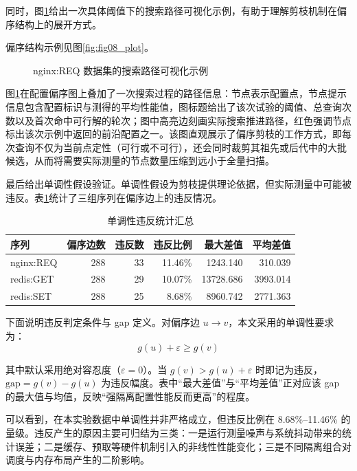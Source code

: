 \documentclass[UTF8,a4paper,12pt,twoside]{ctexart}  %
\begin{document}
同时，图\ref{fig:nginx-search-path}给出一次具体阈值下的搜索路径可视化示例，有助于理解剪枝机制在偏序结构上的展开方式。

偏序结构示例见图\ref{fig:fig08_plot}。

\begin{figure}[h]
  \centering
  
  \caption{nginx:REQ 数据集的搜索路径可视化示例}
  \label{fig:nginx-search-path}
\end{figure}

图\ref{fig:nginx-search-path}在配置偏序图上叠加了一次搜索过程的路径信息：节点表示配置点，节点提示信息包含配置标识与测得的平均性能值，图标题给出了该次试验的阈值、总查询次数以及首次命中可行解的轮次；图中高亮边刻画实际搜索推进路径，红色强调节点标出该次示例中返回的前沿配置之一。该图直观展示了偏序剪枝的工作方式，即每次查询不仅为当前点定性（可行或不可行），还会同时裁剪其祖先或后代中的大批候选，从而将需要实际测量的节点数量压缩到远小于全量扫描。

最后给出单调性假设验证。单调性假设为剪枝提供理论依据，但实际测量中可能被违反。表\ref{tab:monotonic-violation-summary}统计了三组序列在偏序边上的违反情况。

{\small
\setlength{\tabcolsep}{4pt}
\begin{longtable}{@{}lrrrrr@{}}
  \caption{单调性违反统计汇总}\label{tab:monotonic-violation-summary} \\
  \toprule
  序列        & 偏序边数 & 违反数 & 违反比例    & 最大差值      & 平均差值        \\
  \midrule
  \endhead
  \bottomrule
  \endlastfoot
  nginx:REQ & 288  & 33  & 11.46\% & 1243.140  & 310.039     \\
  redis:GET & 288  & 29  & 10.07\% & 13728.686 & 3993.014    \\
  redis:SET & 288  & 25  & 8.68\%  & 8960.742  & 2771.363    \\
\end{longtable}
}

下面说明违反判定条件与 gap 定义。对偏序边 \(u\to v\)，本文采用的单调性要求为：
\begin{equation}
  g(u) + \varepsilon \ge g(v)
\end{equation}

其中默认采用绝对容忍度（\(\varepsilon=0\)）。当
\(g(v) > g(u)+\varepsilon\) 时即记为违反，\(\text{gap}=g(v)-g(u)\)
为违反幅度。表中``最大差值''与``平均差值''正对应该 gap
的最大值与均值，反映``强隔离配置性能反而更高''的程度。

可以看到，在本实验数据中单调性并非严格成立，但违反比例在 8.68\%--11.46\%
的量级。违反产生的原因主要可归结为三类：一是运行测量噪声与系统抖动带来的统计误差；二是缓存、预取等硬件机制引入的非线性性能变化；三是不同隔离组合对调度与内存布局产生的二阶影响。
\end{document}

